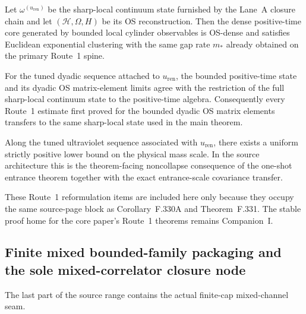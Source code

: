 \begin{theorem}
Let $\omega^{(u_{\mathrm{ren}})}$ be the sharp-local continuum state furnished by the Lane~A closure chain and let $(\mathcal H,\Omega,H)$ be its OS reconstruction. Then the dense positive-time core generated by bounded local cylinder observables is OS-dense and satisfies Euclidean exponential clustering with the same gap rate $m_\ast$ already obtained on the primary Route~1 spine.
\end{theorem}

\begin{theorem}
For the tuned dyadic sequence attached to $u_{\mathrm{ren}}$, the bounded positive-time state and its dyadic OS matrix-element limits agree with the restriction of the full sharp-local continuum state to the positive-time algebra. Consequently every Route~1 estimate first proved for the bounded dyadic OS matrix elements transfers to the same sharp-local state used in the main theorem.
\end{theorem}

\begin{corollary}
Along the tuned ultraviolet sequence associated with $u_{\mathrm{ren}}$, there exists a uniform strictly positive lower bound on the physical mass scale. In the source architecture this is the theorem-facing noncollapse consequence of the one-shot entrance theorem together with the exact entrance-scale covariance transfer.
\end{corollary}

\begin{remark}
These Route~1 reformulation items are included here only because they occupy the same source-page block as Corollary~F.330A and Theorem~F.331. The stable proof home for the core paper's Route~1 theorems remains Companion~I.
\end{remark}

\subsection{Finite mixed bounded-family packaging and the sole mixed-correlator closure node}
The last part of the source range contains the actual finite-cap mixed-channel seam.

